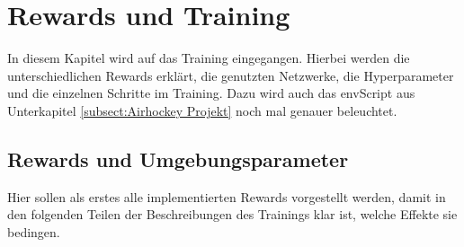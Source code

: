 \chapter{Rewards und Training}  
\label{ch:rewards_training}
In diesem Kapitel wird auf das Training eingegangen. Hierbei werden die unterschiedlichen Rewards erklärt, die genutzten Netzwerke, die Hyperparameter und die einzelnen Schritte im Training. Dazu wird auch das envScript aus Unterkapitel \ref{subsect:Airhockey Projekt} noch mal genauer beleuchtet.

\section{Rewards und Umgebungsparameter}
\label{sect:rewards_params}
Hier sollen als erstes alle implementierten Rewards vorgestellt werden, damit in den folgenden Teilen der Beschreibungen des Trainings klar ist, welche Effekte sie bedingen.

